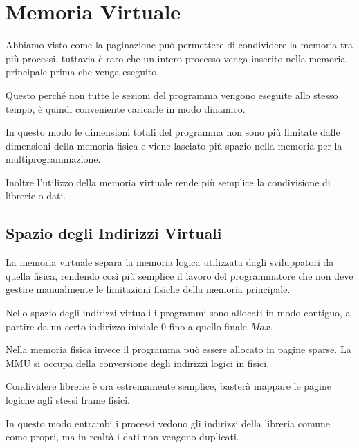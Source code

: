 \section{Memoria Virtuale}
Abbiamo visto come la paginazione può permettere di condividere la memoria tra più processi, tuttavia è raro che un intero processo venga inserito nella memoria principale prima che venga eseguito.

Questo perché non tutte le sezioni del programma vengono eseguite allo stesso tempo, è quindi conveniente caricarle in modo dinamico.

\spacer
In questo modo le dimensioni totali del programma non sono più limitate dalle dimensioni della memoria fisica e viene lasciato più spazio nella memoria per la multiprogrammazione.

Inoltre l'utilizzo della memoria virtuale rende più semplice la condivisione di librerie o dati.

\subsection{Spazio degli Indirizzi Virtuali}
La memoria virtuale separa la memoria logica utilizzata dagli sviluppatori da quella fisica, rendendo così più semplice il lavoro del programmatore che non deve gestire manualmente le limitazioni fisiche della memoria principale.

\spacer

Nello spazio degli indirizzi virtuali i programmi sono allocati in modo contiguo, a partire da un certo indirizzo iniziale $0$ fino a quello finale $Max$.

Nella memoria fisica invece il programma può essere allocato in pagine sparse. La MMU si occupa della conversione degli indirizzi logici in fisici.

\spacer
Condividere librerie è ora estremamente semplice, basterà mappare le pagine logiche agli stessi frame fisici.

In questo modo entrambi i processi vedono gli indirizzi della libreria comune come propri, ma in realtà i dati non vengono duplicati.
